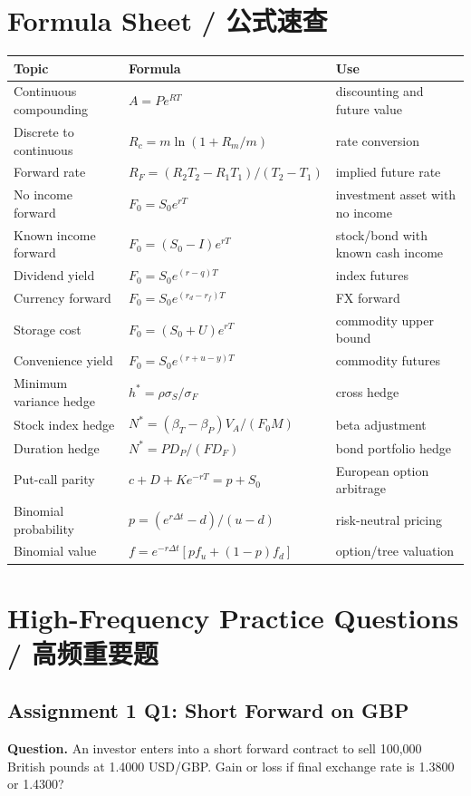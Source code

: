 \documentclass[11pt,a4paper,openany]{ctexbook}
\begin{document}


\chapter{Formula Sheet / 公式速查}
\begin{longtable}{p{}p{}p{}}
\toprule
\textbf{Topic} & \textbf{Formula} & \textbf{Use} \\
\midrule
Continuous compounding & $A=Pe^{RT}$ & discounting and future value \\
Discrete to continuous & $R_c=m\ln(1+R_m/m)$ & rate conversion \\
Forward rate & $R_F=(R_2T_2-R_1T_1)/(T_2-T_1)$ & implied future rate \\
No income forward & $F_0=S_0e^{rT}$ & investment asset with no income \\
Known income forward & $F_0=(S_0-I)e^{rT}$ & stock/bond with known cash income \\
Dividend yield & $F_0=S_0e^{(r-q)T}$ & index futures \\
Currency forward & $F_0=S_0e^{(r_d-r_f)T}$ & FX forward \\
Storage cost & $F_0=(S_0+U)e^{rT}$ & commodity upper bound \\
Convenience yield & $F_0=S_0e^{(r+u-y)T}$ & commodity futures \\
Minimum variance hedge & $h^\ast=\rho\sigma_S/\sigma_F$ & cross hedge \\
Stock index hedge & $N^\ast=(\beta_T-\beta_P)V_A/(F_0M)$ & beta adjustment \\
Duration hedge & $N^\ast=PD_P/(FD_F)$ & bond portfolio hedge \\
Put-call parity & $c+D+Ke^{-rT}=p+S_0$ & European option arbitrage \\
Binomial probability & $p=(e^{r\Delta t}-d)/(u-d)$ & risk-neutral pricing \\
Binomial value & $f=e^{-r\Delta t}[pf_u+(1-p)f_d]$ & option/tree valuation \\
\bottomrule
\end{longtable}

\chapter{High-Frequency Practice Questions / 高频重要题}

\section{Assignment 1 Q1: Short Forward on GBP}
\textbf{Question.} An investor enters into a short forward contract to sell 100,000 British pounds at 1.4000 USD/GBP. Gain or loss if final exchange rate is 1.3800 or 1.4300?
\end{document}
